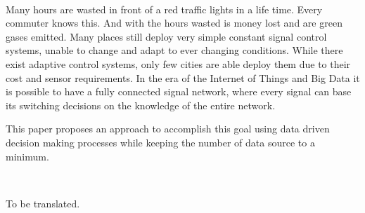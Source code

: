 \vspace{3cm}
\begingroup
{}\\
\endgroup
\vspace{1.5cm}

Many hours are wasted in front of a red traffic lights in a life time. Every commuter knows this. And with the hours wasted is money lost and are green gases emitted. Many places still deploy very simple constant signal control systems, unable to change and adapt to ever changing conditions. While there exist adaptive control systems, only few cities are able deploy them due to their cost and sensor requirements. In the era of the Internet of Things and Big Data it is possible to have a fully connected signal network, where every signal can base its switching decisions on the knowledge of the entire network.

This paper proposes an approach to accomplish this goal using data driven decision making processes while keeping the number of data source to a minimum.


\vspace{2cm}
\begingroup
{}\\
\endgroup
\vspace{1.5cm}

To be translated.
